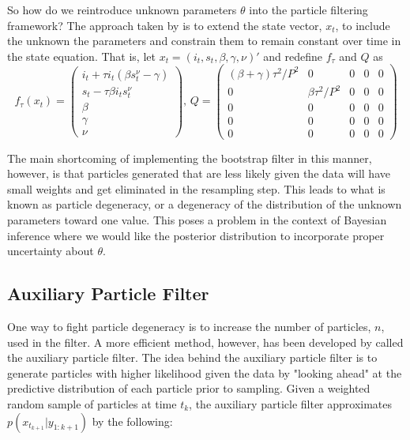 \documentclass{article}
\begin{document}
So how do we reintroduce unknown parameters $\theta$ into the particle filtering framework?  The approach taken by \citet{skvortsov2012monitoring} is to extend the state vector, $x_t$, to include the unknown the parameters and constrain them to remain constant over time in the state equation.  That is, let $x_t = (i_t,s_t,\beta,\gamma,\nu)'$ and redefine $f_\tau$ and $Q$ as
\[
f_\tau(x_t) = \left(
\begin{array}{c}
i_t + \tau i_t(\beta s^{\nu}_t - \gamma) \\
s_t - \tau\beta i_ts^{\nu}_t \\
\beta \\
\gamma \\
\nu
\end{array}
\right)
\mbox{, }
Q = \left(
\begin{array}{ccccc}
(\beta + \gamma)\tau^2/P^2 & 0 & 0 & 0 & 0 \\
0 & \beta\tau^2/P^2 & 0 & 0 & 0 \\
0 & 0 & 0 & 0 & 0 \\
0 & 0 & 0 & 0 & 0 \\
0 & 0 & 0 & 0 & 0
\end{array}
\right)
 \]

\noindent The main shortcoming of implementing the bootstrap filter in this manner, however, is that particles generated that are less likely given the data will have small weights and get eliminated in the resampling step.  This leads to what is known as particle degeneracy, or a degeneracy of the distribution of the unknown parameters toward one value.  This poses a problem in the context of Bayesian inference where we would like the posterior distribution to incorporate proper uncertainty about $\theta$.

\subsection{Auxiliary Particle Filter}

One way to fight particle degeneracy is to increase the number of particles, $n$, used in the filter.  A more efficient method, however, has been developed by \citet{Pitt:Shep:filt:1999} called the auxiliary particle filter.  The idea behind the auxiliary particle filter is to generate particles with higher likelihood given the data by "looking ahead" at the predictive distribution of each particle prior to sampling.  Given a weighted random sample of particles at time $t_k$, the auxiliary particle filter approximates $p(x_{t_{k+1}}|y_{1:k+1})$ by the following:
\end{document}
